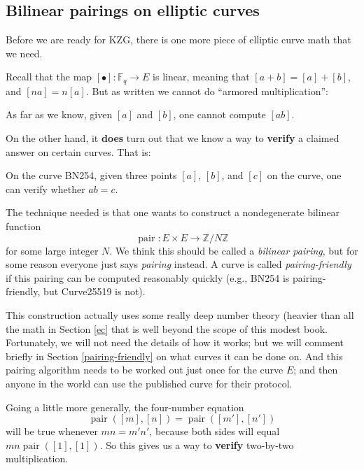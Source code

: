 \subsection{Bilinear pairings on elliptic curves}\label{pair}

Before we are ready for KZG, there is one more piece of elliptic curve
math that we need.

Recall that the map
\([ \bullet ]:{\mathbb{F}}_{q} \rightarrow E\) is linear,
meaning that
\([ a + b] = [ a] + [ b]\), and
\([ na] = n[ a]\). But as written we cannot do
``armored multiplication'':

\begin{claim}
As far as we know, given $[a]$ and $[b]$, one cannot compute $[a b]$.
\end{claim}

On the other hand, it \textbf{does} turn out that we know a way to
\textbf{verify} a claimed answer on certain curves. That is:

\begin{proposition}
On the curve BN254, given three points \([ a]\),
\([ b]\), and \([ c]\) on the curve, one can
verify whether \(ab = c\).
\end{proposition}

The technique needed is that one wants to construct a nondegenerate
bilinear function
\[\operatorname{pair}:E \times E \rightarrow {\mathbb{Z}}/N{\mathbb{Z}}\]
for some large integer \(N\). We think this should be called a
\emph{bilinear pairing}, but for some reason everyone just says
\emph{pairing} instead. A curve is called \emph{pairing-friendly} if
this pairing can be computed reasonably quickly (e.g., BN254 is
pairing-friendly, but Curve25519 is not).

This construction actually uses some really deep number theory (heavier
than all the math in Section \ref{ec} that is well beyond the scope of this
modest book. Fortunately, we will not need the details of how it works;
but we will comment briefly in
Section \ref{pairing-friendly} on what curves it
can be done on. And this pairing algorithm needs to be worked out just
once for the curve \(E\); and then anyone in the world can use the
published curve for their protocol.

Going a little more generally, the four-number equation
\[\operatorname{pair}([ m],[ n]) = \operatorname{pair}([ m'],[ n'])\]
will be true whenever \(mn = m'n'\), because both sides will equal
\(mn\operatorname{pair}([ 1],[ 1])\). So this
gives us a way to \textbf{verify} two-by-two multiplication.

